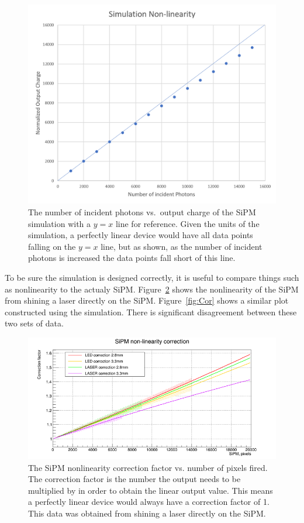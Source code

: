 \begin{figure}
\centering
\includegraphics[width=0.8\linewidth]{Figures/SimNon.png}
\caption{The number of incident photons vs.\ output charge of the SiPM simulation with a $y=x$ line for reference. Given the units of the simulation, a perfectly linear device would have all data points falling on the $y=x$ line, but as shown, as the number of incident photons is increased the data points fall short of this line.}
\label{fig:SimNon}
\end{figure}

To be sure the simulation is designed correctly, it is useful to compare things such as nonlinearity to the actualy SiPM. Figure~\ref{fig:NonLin} shows the nonlinearity of the SiPM from shining a laser directly on the SiPM. Figure~\ref{fig:Cor} shows a similar plot constructed using the simulation. There is significant disagreement between these two sets of data.

\begin{figure}
\centering
\includegraphics[width=\linewidth]{Figures/LaserNonLin.png}
\caption{The SiPM nonlinearity correction factor vs. number of pixels fired. The correction factor is the number the output needs to be multiplied by in order to obtain the linear output value. This means a perfectly linear device would always have a correction factor of 1. This data was obtained from shining a laser directly on the SiPM.}
\label{fig:NonLin}
\end{figure}

